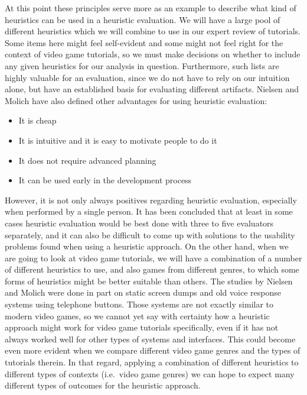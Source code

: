At this point these principles serve more as an example to describe what kind of heuristics can be used in a heuristic evaluation. We will have a large pool of different heuristics which we will combine to use in our expert review of tutorials. Some items here might feel self-evident and some might not feel right for the context of video game tutorials, so we must make decisions on whether to include any given heuristics for our analysis in question. Furthermore, such lists are highly valuable for an evaluation, since we do not have to rely on our intuition alone, but have an established basis for evaluating different artifacts. Nielsen and Molich have also defined other advantages for using heuristic evaluation: \cite{Nielsen1990}

\begin{itemize}
	\item It is cheap
	\item It is intuitive and it is easy to motivate people to do it
	\item It does not require advanced planning
	\item It can be used early in the development process
\end{itemize}

However, it is not only always positives regarding heuristic evaluation, especially when performed by a single person. It has been concluded that at least in some cases heuristic evaluation would be best done with three to five evaluators separately, and it can also be difficult to come up with solutions to the usability problems found when using a heuristic approach. \cite{Nielsen1990} On the other hand, when we are going to look at video game tutorials, we will have a combination of a number of different heuristics to use, and also games from different genres, to which some forms of heuristics might be better suitable than others. The studies by Nielsen and Molich were done in part on static screen dumps and old voice response systems using telephone buttons. Those systems are not exactly similar to modern video games, so we cannot yet say with certainty how a heuristic approach might work for video game tutorials specifically, even if it has not always worked well for other types of systems and interfaces. This could become even more evident when we compare different video game genres and the types of tutorials therein. In that regard, applying a combination of different heuristics to different types of contexts (i.e.\ video game genres) we can hope to expect many different types of outcomes for the heuristic approach.

